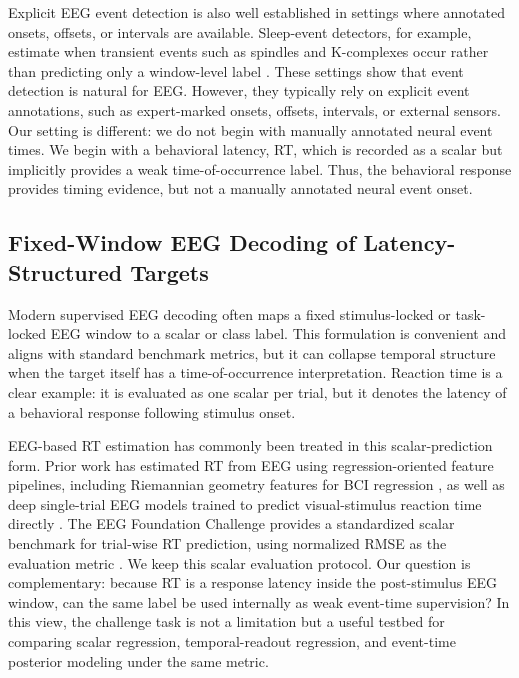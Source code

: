 \documentclass[12pt]{article}
\begin{document}
Explicit EEG event detection is also well established in settings where annotated onsets, offsets, or intervals are available. Sleep-event detectors, for example, estimate when transient events such as spindles and K-complexes occur rather than predicting only a window-level label \citep{Chambon2019DOSED,TapiaRivas2024SEED}. These settings show that event detection is natural for EEG. However, they typically rely on explicit event annotations, such as expert-marked onsets, offsets, intervals, or external sensors. Our setting is different: we do not begin with manually annotated neural event times. We begin with a behavioral latency, RT, which is recorded as a scalar but implicitly provides a weak time-of-occurrence label. Thus, the behavioral response provides timing evidence, but not a manually annotated neural event onset.

\subsection{Fixed-Window EEG Decoding of Latency-Structured Targets}
Modern supervised EEG decoding often maps a fixed stimulus-locked or task-locked EEG window to a scalar or class label. This formulation is convenient and aligns with standard benchmark metrics, but it can collapse temporal structure when the target itself has a time-of-occurrence interpretation. Reaction time is a clear example: it is evaluated as one scalar per trial, but it denotes the latency of a behavioral response following stimulus onset.

EEG-based RT estimation has commonly been treated in this scalar-prediction form. Prior work has estimated RT from EEG using regression-oriented feature pipelines, including Riemannian geometry features for BCI regression \citep{Wu2017RiemannianRT}, as well as deep single-trial EEG models trained to predict visual-stimulus reaction time directly \citep{Chowdhury2020RTSensors}. The EEG Foundation Challenge provides a standardized scalar benchmark for trial-wise RT prediction, using normalized RMSE as the evaluation metric \citep{EEGFoundationChallengeArxiv2025,EEGChallengeWebsite2025}. We keep this scalar evaluation protocol. Our question is complementary: because RT is a response latency inside the post-stimulus EEG window, can the same label be used internally as weak event-time supervision? In this view, the challenge task is not a limitation but a useful testbed for comparing scalar regression, temporal-readout regression, and event-time posterior modeling under the same metric.
\end{document}
